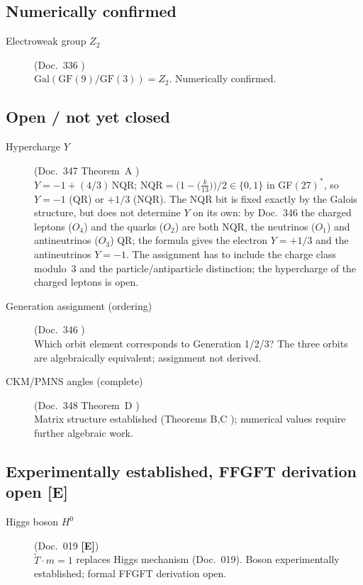 \subsection*{Numerically confirmed \KM}

\begin{description}

\item[Electroweak group $Z_2$] (Doc.~336 \KM)\\
$\mathrm{Gal}(\mathrm{GF}(9)/\mathrm{GF}(3)) = Z_2$. Numerically confirmed.

\end{description}

\subsection*{Open / not yet closed \SM}

\begin{description}

\item[Hypercharge $Y$] (Doc.~347 Theorem~A \SM)\\
$Y = -1 + (4/3)\,\mathrm{NQR}$; $\mathrm{NQR} = \bigl(1 - \bigl(\tfrac{k}{13}\bigr)\bigr)/2 \in \{0,1\}$ in GF$(27)^*$,
so $Y = -1$ (QR) or $+1/3$ (NQR). The NQR bit is fixed exactly by the
Galois structure, but does not determine $Y$ on its own: by Doc.~346 the
charged leptons ($O_4$) and the quarks ($O_2$) are both NQR, the neutrinos
($O_1$) and antineutrinos ($O_3$) QR; the formula gives the electron
$Y = +1/3$ and the antineutrinos $Y = -1$. The assignment has to include
the charge class modulo~3 and the particle/antiparticle distinction; the
hypercharge of the charged leptons is open.

\item[Generation assignment (ordering)] (Doc.~346 \SM)\\
Which orbit element corresponds to Generation 1/2/3?
The three orbits are algebraically equivalent; assignment not derived.

\item[CKM/PMNS angles (complete)] (Doc.~348 Theorem~D \SM)\\
Matrix structure established (Theorems B,C \BM);
numerical values require further algebraic work.

\end{description}

\subsection*{Experimentally established, FFGFT derivation open \textbf{[E]}}

\begin{description}

\item[Higgs boson $H^0$] (Doc.~019 \textbf{[E]})\\
$\tilde{T}\cdot m=1$ replaces Higgs mechanism (Doc.~019).
Boson experimentally established; formal FFGFT derivation open.

\end{description}
